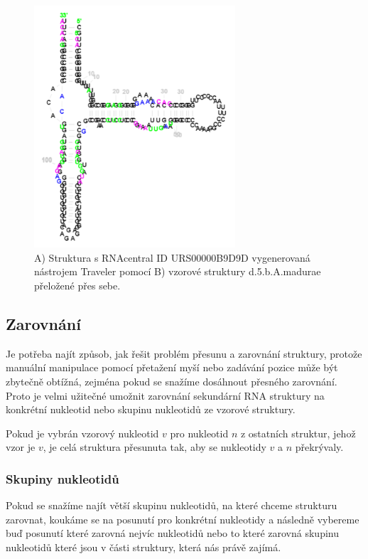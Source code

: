 \begin{figure}[H]
  \centering
  \includegraphics[height=90mm]{../img/kap02/align/unaligned.png}
  \caption{A) Struktura s RNAcentral ID URS00000B9D9D vygenerovaná nástrojem
  Traveler pomocí B) vzorové struktury d.5.b.A.madurae přeložené přes sebe.}
\end{figure}

\subsection{Zarovnání}

Je potřeba najít způsob, jak řešit problém přesunu a zarovnání struktury,
protože manuální manipulace pomocí přetažení myší nebo zadávání pozice může být
zbytečně obtížná, zejména pokud se snažíme dosáhnout přesného zarovnání. Proto
je velmi užitečné umožnit zarovnání sekundární RNA struktury na konkrétní
nukleotid nebo skupinu nukleotidů ze vzorové struktury. 

Pokud je vybrán vzorový nukleotid $v$ pro nukleotid $n$ z ostatních struktur,
jehož vzor je $v$, je celá struktura přesunuta tak, aby se nukleotidy $v$ a $n$
překrývaly. 

\subsubsection{Skupiny nukleotidů}

Pokud se snažíme najít větší skupinu nukleotidů, na které chceme strukturu
zarovnat, koukáme se na posunutí pro konkrétní nukleotidy a následně vybereme
buď posunutí které zarovná nejvíc nukleotidů nebo to které zarovná skupinu
nukleotidů které jsou v části struktury, která nás právě zajímá.

